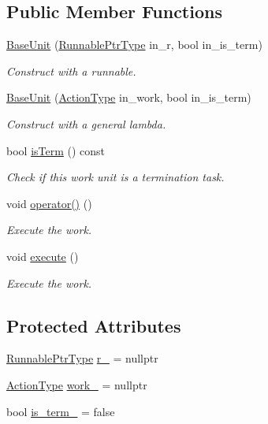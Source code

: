 \subsection*{Public Member Functions}
\begin{DoxyCompactItemize}
\item 
\hyperlink{structvt_1_1sched_1_1_base_unit_a3474174416a6c22a52001f0a65247b52}{Base\+Unit} (\hyperlink{structvt_1_1sched_1_1_base_unit_a9be5d5adaeb011c8ef82f751485ebf9a}{Runnable\+Ptr\+Type} in\+\_\+r, bool in\+\_\+is\+\_\+term)
\begin{DoxyCompactList}\small\item\em Construct with a runnable. \end{DoxyCompactList}\item 
\hyperlink{structvt_1_1sched_1_1_base_unit_a4e12a566748bf37a777442ee0bc6ba76}{Base\+Unit} (\hyperlink{namespacevt_ae0a5a7b18cc99d7b732cb4d44f46b0f3}{Action\+Type} in\+\_\+work, bool in\+\_\+is\+\_\+term)
\begin{DoxyCompactList}\small\item\em Construct with a general lambda. \end{DoxyCompactList}\item 
bool \hyperlink{structvt_1_1sched_1_1_base_unit_a18e4bf669d499be8e9443011bf9c6b02}{is\+Term} () const
\begin{DoxyCompactList}\small\item\em Check if this work unit is a termination task. \end{DoxyCompactList}\item 
void \hyperlink{structvt_1_1sched_1_1_base_unit_accbb274436789b6b8ed99c3ee42a8114}{operator()} ()
\begin{DoxyCompactList}\small\item\em Execute the work. \end{DoxyCompactList}\item 
void \hyperlink{structvt_1_1sched_1_1_base_unit_aba3a1772f8a5efb922656dfba6434136}{execute} ()
\begin{DoxyCompactList}\small\item\em Execute the work. \end{DoxyCompactList}\end{DoxyCompactItemize}
\subsection*{Protected Attributes}
\begin{DoxyCompactItemize}
\item 
\hyperlink{structvt_1_1sched_1_1_base_unit_a9be5d5adaeb011c8ef82f751485ebf9a}{Runnable\+Ptr\+Type} \hyperlink{structvt_1_1sched_1_1_base_unit_a0d126796f0ee5a8e0f3304e6ca02d0fc}{r\+\_\+} = nullptr
\item 
\hyperlink{namespacevt_ae0a5a7b18cc99d7b732cb4d44f46b0f3}{Action\+Type} \hyperlink{structvt_1_1sched_1_1_base_unit_ab425435c3b6c1cdf2fc208f1e50ea84c}{work\+\_\+} = nullptr
\item 
bool \hyperlink{structvt_1_1sched_1_1_base_unit_a5aab7332c91c6ccdc76bdb55de9cc502}{is\+\_\+term\+\_\+} = false
\end{DoxyCompactItemize}


